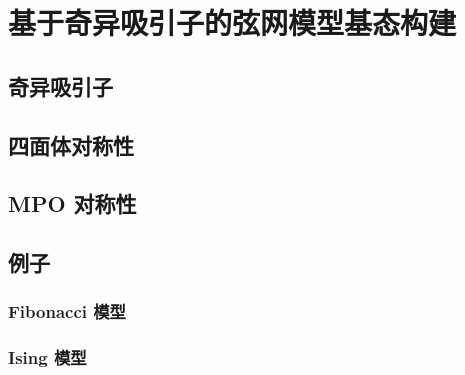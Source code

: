 \chapter{基于奇异吸引子的弦网模型基态构建}

\section{奇异吸引子}

\section{四面体对称性}

\section{MPO 对称性}

\section{例子}

\subsection{Fibonacci 模型}

\subsection{Ising 模型}
